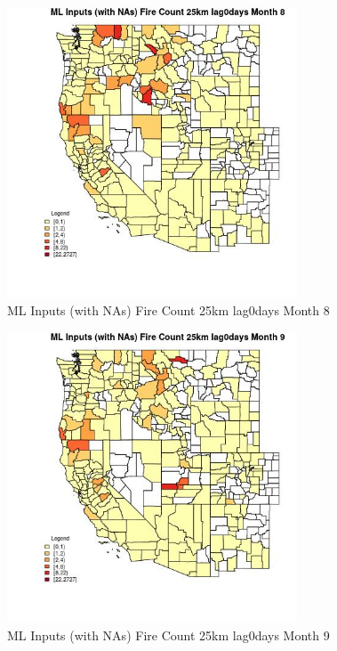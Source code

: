\begin{figure} 
\centering  
\includegraphics[width=0.77\textwidth]{Code_Outputs/Report_ML_input_PM25_Step4_part_f_de_duplicated_aveswNAs_CountyFire_Count_25km_lag0daysmedianMonth8.jpg} 
\caption{\label{fig:Report_ML_input_PM25_Step4_part_f_de_duplicated_aveswNAsCountyFire_Count_25km_lag0daysmedianMonth8}ML Inputs (with NAs) Fire Count 25km lag0days Month 8} 
\end{figure} 
 

\begin{figure} 
\centering  
\includegraphics[width=0.77\textwidth]{Code_Outputs/Report_ML_input_PM25_Step4_part_f_de_duplicated_aveswNAs_CountyFire_Count_25km_lag0daysmedianMonth9.jpg} 
\caption{\label{fig:Report_ML_input_PM25_Step4_part_f_de_duplicated_aveswNAsCountyFire_Count_25km_lag0daysmedianMonth9}ML Inputs (with NAs) Fire Count 25km lag0days Month 9} 
\end{figure} 
 

